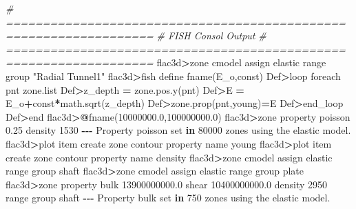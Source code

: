 \documentclass[a4paper, nobind]{templates/ociamthesis}
\newenvironment{Shaded}{\begin{snugshade}}{\end{snugshade}}
\newcommand{\BuiltInTok}[1]{#1}
\newcommand{\CommentTok}[1]{\textcolor[rgb]{0.56,0.35,0.01}{\textit{#1}}}
\newcommand{\DecValTok}[1]{\textcolor[rgb]{0.00,0.00,0.81}{#1}}
\newcommand{\FloatTok}[1]{\textcolor[rgb]{0.00,0.00,0.81}{#1}}
\newcommand{\KeywordTok}[1]{\textcolor[rgb]{0.13,0.29,0.53}{\textbf{#1}}}
\newcommand{\NormalTok}[1]{#1}
\newcommand{\OperatorTok}[1]{\textcolor[rgb]{0.81,0.36,0.00}{\textbf{#1}}}
\newcommand{\StringTok}[1]{\textcolor[rgb]{0.31,0.60,0.02}{#1}}
\renewenvironment{Shaded}
{
  \vspace{10pt}%
  \begin{snugshade}%
}{%
  \end{snugshade}%
  \vspace{8pt}%
}
\begin{document}
\begin{Shaded}
\begin{Highlighting}[]
\CommentTok{\# ==================================================================}
\CommentTok{\#   FISH Consol Output}
\CommentTok{\# ==================================================================}
\NormalTok{flac3d}\OperatorTok{\textgreater{}}\NormalTok{zone cmodel assign elastic }\BuiltInTok{range}\NormalTok{ group }\StringTok{"Radial Tunnel1"}
\NormalTok{flac3d}\OperatorTok{\textgreater{}}\NormalTok{fish define fname(E\_o,const)}
\NormalTok{   Def}\OperatorTok{\textgreater{}}\NormalTok{loop foreach pnt zone.}\BuiltInTok{list}
\NormalTok{   Def}\OperatorTok{\textgreater{}}\NormalTok{z\_depth }\OperatorTok{=}\NormalTok{ zone.pos.y(pnt)}
\NormalTok{   Def}\OperatorTok{\textgreater{}}\NormalTok{E }\OperatorTok{=}\NormalTok{ E\_o}\OperatorTok{+}\NormalTok{const}\OperatorTok{*}\NormalTok{math.sqrt(z\_depth)}
\NormalTok{   Def}\OperatorTok{\textgreater{}}\NormalTok{zone.prop(pnt,}\StringTok{\textquotesingle{}young\textquotesingle{}}\NormalTok{)}\OperatorTok{=}\NormalTok{E}
\NormalTok{   Def}\OperatorTok{\textgreater{}}\NormalTok{end\_loop}
\NormalTok{   Def}\OperatorTok{\textgreater{}}\NormalTok{end}
\NormalTok{flac3d}\OperatorTok{\textgreater{}@}\NormalTok{fname(}\FloatTok{10000000.0}\NormalTok{,}\FloatTok{100000000.0}\NormalTok{)}
\NormalTok{flac3d}\OperatorTok{\textgreater{}}\NormalTok{zone }\BuiltInTok{property}\NormalTok{ poisson }\FloatTok{0.25}\NormalTok{ density }\DecValTok{1530}
\OperatorTok{{-}{-}{-}}\NormalTok{ Property poisson }\BuiltInTok{set} \KeywordTok{in} \DecValTok{80000}\NormalTok{ zones using the elastic model.}
\NormalTok{flac3d}\OperatorTok{\textgreater{}}\NormalTok{plot item create zone contour }\BuiltInTok{property}\NormalTok{ name }\StringTok{\textquotesingle{}young\textquotesingle{}}
\NormalTok{flac3d}\OperatorTok{\textgreater{}}\NormalTok{plot item create zone contour }\BuiltInTok{property}\NormalTok{ name }\StringTok{\textquotesingle{}density\textquotesingle{}}
\NormalTok{flac3d}\OperatorTok{\textgreater{}}\NormalTok{zone cmodel assign elastic }\BuiltInTok{range}\NormalTok{ group }\StringTok{\textquotesingle{}shaft\textquotesingle{}}
\NormalTok{flac3d}\OperatorTok{\textgreater{}}\NormalTok{zone cmodel assign elastic }\BuiltInTok{range}\NormalTok{ group }\StringTok{\textquotesingle{}plate\textquotesingle{}}
\NormalTok{flac3d}\OperatorTok{\textgreater{}}\NormalTok{zone }\BuiltInTok{property}\NormalTok{ bulk }\FloatTok{13900000000.0}\NormalTok{ shear }\FloatTok{10400000000.0}\NormalTok{ density }\DecValTok{2950} \BuiltInTok{range}\NormalTok{ group }\StringTok{\textquotesingle{}shaft\textquotesingle{}}
\OperatorTok{{-}{-}{-}}\NormalTok{ Property bulk }\BuiltInTok{set} \KeywordTok{in} \DecValTok{750}\NormalTok{ zones using the elastic model.}

\end{Highlighting}
\end{Shaded}
\end{document}
